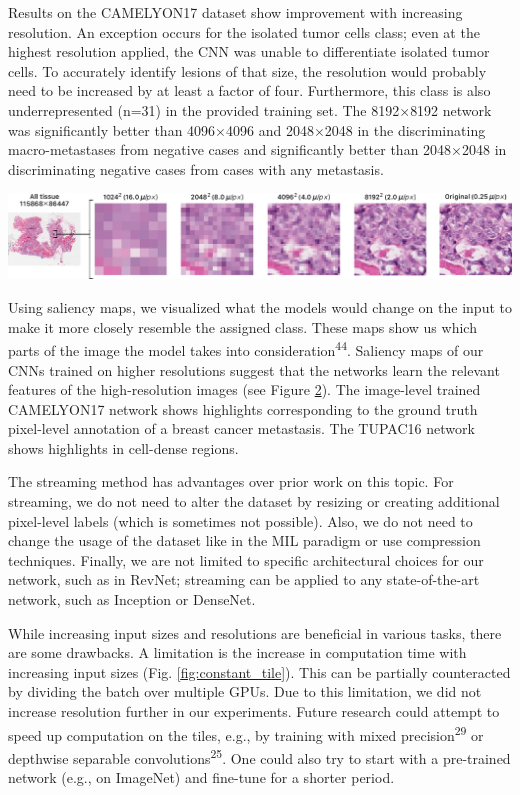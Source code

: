 \documentclass[
  12pt,
  a5,margin=2cmpaper,
]{article}
\begin{document}
Results on the CAMELYON17 dataset show improvement with increasing
resolution. An exception occurs for the isolated tumor cells class; even
at the highest resolution applied, the CNN was unable to differentiate
isolated tumor cells. To accurately identify lesions of that size, the
resolution would probably need to be increased by at least a factor of
four. Furthermore, this class is also underrepresented (n=31) in the
provided training set. The 8192\(\times\)8192 network was significantly
better than 4096\(\times\)4096 and 2048\(\times\)2048 in the
discriminating macro-metastases from negative cases and significantly
better than 2048\(\times\)2048 in discriminating negative cases from
cases with any metastasis.

\includegraphics{chpt2_imgs/tupac_rebuttal.png}

Using saliency maps, we visualized what the models would change on the
input to make it more closely resemble the assigned class. These maps
show us which parts of the image the model takes into
consideration\textsuperscript{44}. Saliency maps of our CNNs trained on
higher resolutions suggest that the networks learn the relevant features
of the high-resolution images (see Figure
\protect\hyperlink{figure:saliency}{2}). The image-level trained
CAMELYON17 network shows highlights corresponding to the ground truth
pixel-level annotation of a breast cancer metastasis. The TUPAC16
network shows highlights in cell-dense regions.

The streaming method has advantages over prior work on this topic. For
streaming, we do not need to alter the dataset by resizing or creating
additional pixel-level labels (which is sometimes not possible). Also,
we do not need to change the usage of the dataset like in the MIL
paradigm or use compression techniques. Finally, we are not limited to
specific architectural choices for our network, such as in RevNet;
streaming can be applied to any state-of-the-art network, such as
Inception or DenseNet.

While increasing input sizes and resolutions are beneficial in various
tasks, there are some drawbacks. A limitation is the increase in
computation time with increasing input sizes (Fig.
\protect\hyperlink{fig:constant_tile}{{[}fig:constant\_tile{]}}). This
can be partially counteracted by dividing the batch over multiple GPUs.
Due to this limitation, we did not increase resolution further in our
experiments. Future research could attempt to speed up computation on
the tiles, e.g., by training with mixed precision\textsuperscript{29} or
depthwise separable convolutions\textsuperscript{25}. One could also try
to start with a pre-trained network (e.g., on ImageNet) and fine-tune
for a shorter period.
\end{document}
